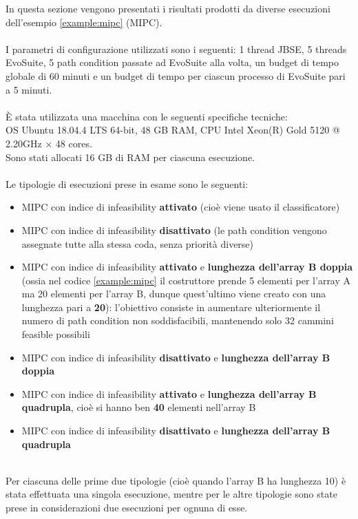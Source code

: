 \documentclass[a4paper, 12pt, oneside]{book}
\theoremstyle{normal}
\begin{document}
In questa sezione vengono presentati i risultati prodotti da diverse esecuzioni dell'esempio \ref{example:mipc} (MIPC). \\ \\ I parametri di configurazione utilizzati sono i seguenti: 1 thread JBSE, 5 threads EvoSuite, 5 path condition passate ad EvoSuite alla volta, un budget di tempo globale di 60 minuti e un budget di tempo per ciascun processo di EvoSuite pari a 5 minuti. \\ \\ È stata utilizzata una macchina con le seguenti specifiche tecniche: \\ OS Ubuntu 18.04.4 LTS 64-bit, 48 GB RAM, CPU Intel Xeon(R) Gold 5120 @ 2.20GHz × 48 cores. \\ Sono stati allocati 16 GB di RAM per ciascuna esecuzione.
\\ \\ Le tipologie di esecuzioni prese in esame sono le seguenti:
\begin{itemize}[itemsep=0pt, topsep=2pt]
    \item MIPC con indice di infeasibility \textbf{attivato} (cioè viene usato il classificatore)
    \item MIPC con indice di infeasibility \textbf{disattivato} (le path condition vengono assegnate tutte alla stessa coda, senza priorità diverse)
    \item MIPC con indice di infeasibility \textbf{attivato} e \textbf{lunghezza dell'array B doppia} (ossia nel codice \ref{example:mipc} il costruttore prende 5 elementi per l'array A ma 20 elementi per l'array B, dunque quest'ultimo viene creato con una lunghezza pari a \textbf{20}): l'obiettivo consiste in aumentare ulteriormente il numero di path condition non soddisfacibili, mantenendo solo 32 cammini feasible possibili
    \item MIPC con indice di infeasibility \textbf{disattivato} e \textbf{lunghezza dell'array B doppia}
    \item MIPC con indice di infeasibility \textbf{attivato} e \textbf{lunghezza dell'array B quadrupla}, cioè si hanno ben \textbf{40} elementi nell'array B
    \item MIPC con indice di infeasibility \textbf{disattivato} e \textbf{lunghezza dell'array B quadrupla}
\end{itemize}
\noindent \\ Per ciascuna delle prime due tipologie (cioè quando l'array B ha lunghezza 10) è stata effettuata una singola esecuzione, mentre per le altre tipologie sono state prese in considerazioni due esecuzioni per ognuna di esse.
\end{document}
